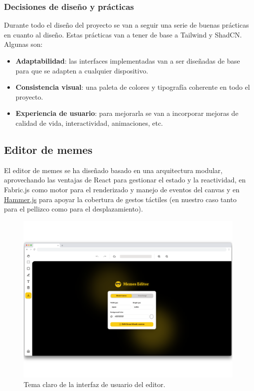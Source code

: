 \subsubsection{Decisiones de diseño y prácticas}

Durante todo el diseño del proyecto se van a seguir una serie de buenas prácticas en cuanto al diseño. Estas prácticas van a tener de base a Tailwind y ShadCN. Algunas son:

\begin{itemize}
    \item \textbf{Adaptabilidad}: las interfaces implementadas van a ser diseñadas de base para que se adapten a cualquier dispositivo.
    \item \textbf{Consistencia visual}: una paleta de colores y tipografía coherente en todo el proyecto.
    \item \textbf{Experiencia de usuario}: para mejorarla se van a incorporar mejoras de calidad de vida, interactividad, animaciones, etc.
\end{itemize}

\subsection{Editor de memes}

El editor de memes se ha diseñado basado en una arquitectura modular, aprovechando las ventajas de React para gestionar el estado y la reactividad, en Fabric.js como motor para el renderizado y manejo de eventos del canvas y en \href{https://hammerjs.github.io/}{Hammer.js} para apoyar la cobertura de gestos táctiles (en nuestro caso tanto para el pellizco como para el desplazamiento).

\begin{figure}[H]
    \caption{Tema claro de la interfaz de usuario del editor.}
    \centering
    \includegraphics[scale=0.11]{figuras/editor_tema_claro.png}
\end{figure}

